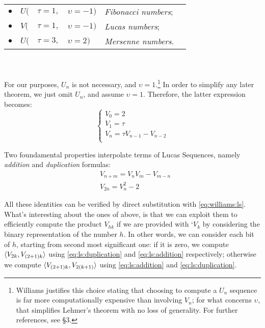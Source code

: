 \begin{tabular}{c l@{\hskip 0pt} l@{\hskip 1pt} l l l}
  $\bullet$ & $U($ & $\tau=1,$ & $\upsilon=-1)$ & \emph{Fibonacci numbers}; \\
  $\bullet$ & $V($ & $\tau=1,$ & $\upsilon=-1)$ & \emph{Lucas numbers}; \\
  $\bullet$ & $U($ & $\tau=3,$ & $\upsilon=2)$ & \emph{Mersenne numbers}.\\
\end{tabular}
\\
\\
For our purposes, $U_n$ is not necessary, and $\upsilon=1$.\footnote{
  Williams justifies this choice stating that choosing to compute a $U_n$ sequence
  is far more computationally expensive than involving $V_n$; for what
  concerns $\upsilon$, that simplifies Lehmer's theorem with no loss of
  generality. For further references,
  see \cite{Williams:p+1} \S 3.}
In order to simplify any later theorem, we just omit $U_n$, and assume $\upsilon
= 1$.
Therefore, the latter expression becomes:
\begin{equation}
  \label{eq:williams:ls}
  \begin{cases}
    V_0 = 2 \\
    V_1 = \tau \\
    V_n = \tau V_{n-1} - V_{n-2} \\
  \end{cases}
\end{equation}

Two foundamental properties interpolate terms of Lucas Sequences, namely
\emph{addition} and \emph{duplication} formulas:
\begin{align}
  & V_{n+m} = V_nV_m - V_{m-n} \label{eq:ls:addition} \\
  & V_{2n} = V_n^2 - 2 \label{eq:ls:duplication}
\end{align}

All these identities can be verified by direct substitution with
\ref{eq:williams:ls}. What's interesting about the ones of above, is that we can
exploit them to efficiently compute the product $V_{hk}$ if we are provided with
`$V_k$ by considering the binary representation of the number
$h$. In other words, we can consider each bit of $h$, starting from second most
significant one: if it is zero, we compute $\langle V_{2k}, V_{(2+1)k}\rangle$ using
\ref{eq:ls:duplication} and \ref{eq:ls:addition} respectively; otherwise we
compute $\langle V_{(2+1)k}, V_{2(k+1)}\rangle$ using \ref{eq:ls:addition} and
\ref{eq:ls:duplication}.


